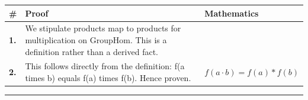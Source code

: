 \documentclass[11pt]{article}
\theoremstyle{definition}
\begin{document}
\medskip
\noindent
\begin{tabular}{@{} >{\raggedright\arraybackslash}p{} >{\raggedright\arraybackslash}p{} >{\raggedleft\arraybackslash}p{} @{}}
\textbf{\#} & \textbf{Proof} & \textbf{Mathematics} \\
\midrule
\textbf{1.} & We stipulate products map to products for multiplication on GroupHom. This is a definition rather than a derived fact. & \\[0.45em]
\textbf{2.} & This follows directly from the definition: f(a times b) equals f(a) times f(b). Hence proven. & $\displaystyle f(a \cdot b) = f(a) * f(b)$ \\[0.45em]
\bottomrule
\end{tabular}
\label{thm:GroupHom-multiplication-products_map_to_products}
\par\medskip\hrule
\end{document}
